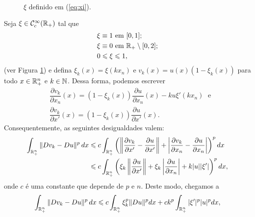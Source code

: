 \begin{prf}
\begin{figure}
        \caption{$\xi$ definido em (\ref{eq:xi}).}
        \label{fig:xi}
    \end{figure}
    Seja $\xi \in \mathcal{C}^{\infty}_c(\mathbb{R}_+)$ tal que
    \begin{equation} \label{eq:xi}
        \begin{aligned}
            &\xi \equiv 1 \text{ em } [0,1];\\
            &\xi \equiv 0 \text{ em } \mathbb{R}_+ \setminus [0,2];\\
            &0 \leqslant \xi \leqslant 1,
        \end{aligned}
    \end{equation}
    (ver Figura \ref{fig:xi}) e defina $\xi_k(x) = \xi(kx_n)$ e $v_k(x) = u(x) (1 - \xi_k(x))$ para todo $x \in \mathbb{R}^n_+$ e $k \in \mathbb{N}$. Dessa forma, podemos escrever
    \[
        \begin{aligned}
            &\dfrac{\partial v_k}{\partial x_n}(x) = (1 - \xi_k(x))\dfrac{\partial u}{\partial x_n}(x) - ku\xi'(kx_n) \;\text{ e}\\
            &\dfrac{\partial v_k}{\partial x'}(x) = (1-\xi_k(x))\dfrac{\partial u}{\partial x'}(x).
        \end{aligned}
    \]
    Consequentemente, as seguintes desigualdades valem:
    \[
        \begin{aligned}
            \int_{\mathbb{R}^n_+} \Vert Dv_k - Du \Vert^p \,dx &\leqslant c \int_{\mathbb{R}^n_+} \left( \left\Vert \dfrac{\partial v_k}{\partial x'} - \dfrac{\partial u}{\partial x'} \right\Vert + \left| \dfrac{\partial v_k}{\partial x_n} - \dfrac{\partial u}{\partial x_n} \right| \right)^p dx\\
            &\leqslant c  \int_{\mathbb{R}^n_+} \left( \xi_k\left\Vert \dfrac{\partial u}{\partial x'} \right\Vert + \xi_k \left| \dfrac{\partial u}{\partial x_n}\right| + k |u| |\xi'|  \right)^p dx,\\ 
        \end{aligned}
    \]
    onde $c$ é uma constante que depende de $p$ e $n$. Deste modo, chegamos a
    \begin{equation} \label{eq:asxa}
        \int_{\mathbb{R}^n_+} \Vert Dv_k - Du \Vert^p \,dx \leqslant c \int_{\mathbb{R}^n_+} \xi_k^p \Vert Du \Vert^p dx + ck^p \int_{\mathbb{R}^n_+} |\xi'|^p |u|^p dx,
    \end{equation}

\end{prf}
